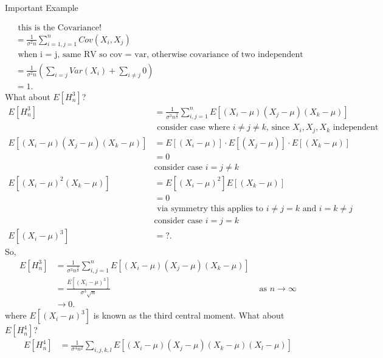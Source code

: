 \documentclass[a4paper]{article}
\begin{document}
\begin{note}{Important Example}
\begin{enumerate}
\begin{align*}
                   &\text{ this is the Covariance!} \\
                   &= \frac{1}{\sigma^{2}n} \sum_{i=1,j=1}^{n} Cov(X_i, X_j)\\
                   &\text{ when i = j, same RV so cov = var, otherwise covariance of two independent RV is 0!}\\
                   &= \frac{1}{\sigma^{2}n} \left( \sum_{i=j} Var(X_i) + \sum_{i \neq j} 0 \right) \\
                   &= 1
      .\end{align*}
      What about $E[H_n^{3}]$?
      \begin{align*}
        E[H_n^{3}] &= \frac{1}{\sigma^{3}n^{\frac{3}{2}}} \sum_{i,j=1}^{n} E[(X_i -\mu)(X_j - \mu)(X_k -\mu)]\\
                   &\text{ consider case where $i\neq j \neq k$, since $X_i,X_j,X_k$ independent}\\
        E[(X_i -\mu)(X_j - \mu)(X_k -\mu)] &= E[(X_i - \mu)] \cdot E[(X_j - \mu)] \cdot E[(X_k - \mu)] \\
                                           &= 0 \\
                                           &\text{consider case $i=j\neq k$} \\
        E[(X_i - \mu)^{2} (X_k - \mu)] &= E[(X_i - \mu)^{2}] E[(X_k - \mu)] \\
                                       &= 0\\
                                       &\text{ via symmetry this applies to $i \neq j = k$ and  $i = k \neq j$ }\\
                                       &\text{consider case $i = j= k$}\\ 
        E[(X_i - \mu)^{3}] &=  ?
      .\end{align*}
      So,
      \begin{align*}
        E[H_n^{3}] &= \frac{1}{\sigma^{3}n^{\frac{3}{2}}} \sum_{i,j=1}^{n} E[(X_i -\mu)(X_j - \mu)(X_k -\mu)]\\
                   &=  \frac{E[(X_i - \mu)^{3}]}{\sigma^{3} \sqrt{n}}  
                   &\text{ as $n \to \infty$} \\
                   &\to 0
      .\end{align*}
      where $ E[(X_i - \mu)^{3}] $ is known as the third central moment. What about $E[H_n^{4}]$?
      \begin{align*}
        E[H_n^{4}] &= \frac{1}{\sigma^{4}n^{2}} \sum_{i,j,k,l} E[(X_i -\mu)(X_j - \mu)(X_k -\mu) (X_l - \mu)]\\

\end{align*}
\end{enumerate}
\end{note}
\end{document}
